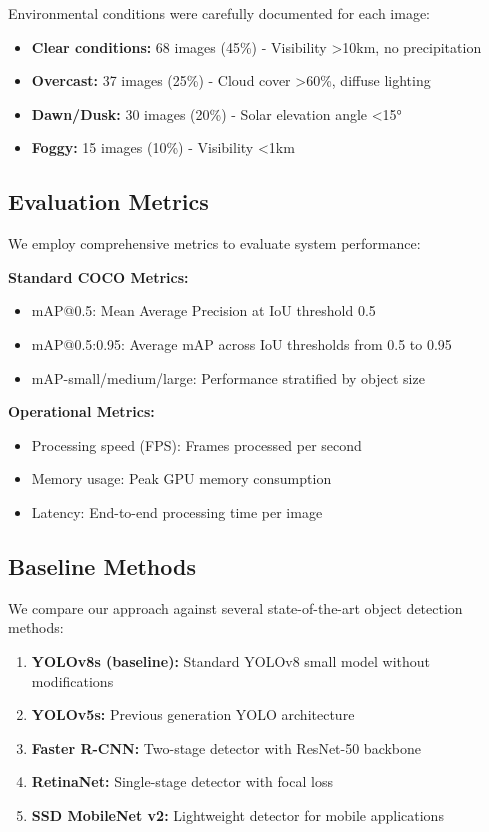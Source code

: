 \documentclass[10pt]{article}
\begin{document}
Environmental conditions were carefully documented for each image:
\begin{itemize}
\item \textbf{Clear conditions:} 68 images (45\%) - Visibility >10km, no precipitation
\item \textbf{Overcast:} 37 images (25\%) - Cloud cover >60\%, diffuse lighting
\item \textbf{Dawn/Dusk:} 30 images (20\%) - Solar elevation angle <15°
\item \textbf{Foggy:} 15 images (10\%) - Visibility <1km
\end{itemize}

\subsection{Evaluation Metrics}

We employ comprehensive metrics to evaluate system performance:

\textbf{Standard COCO Metrics:}
\begin{itemize}
\item mAP@0.5: Mean Average Precision at IoU threshold 0.5
\item mAP@0.5:0.95: Average mAP across IoU thresholds from 0.5 to 0.95
\item mAP-small/medium/large: Performance stratified by object size
\end{itemize}

\textbf{Operational Metrics:}
\begin{itemize}
\item Processing speed (FPS): Frames processed per second
\item Memory usage: Peak GPU memory consumption
\item Latency: End-to-end processing time per image
\end{itemize}

\subsection{Baseline Methods}

We compare our approach against several state-of-the-art object detection methods:

\begin{enumerate}
\item \textbf{YOLOv8s (baseline):} Standard YOLOv8 small model without modifications
\item \textbf{YOLOv5s:} Previous generation YOLO architecture
\item \textbf{Faster R-CNN:} Two-stage detector with ResNet-50 backbone
\item \textbf{RetinaNet:} Single-stage detector with focal loss
\item \textbf{SSD MobileNet v2:} Lightweight detector for mobile applications
\end{enumerate}
\end{document}
